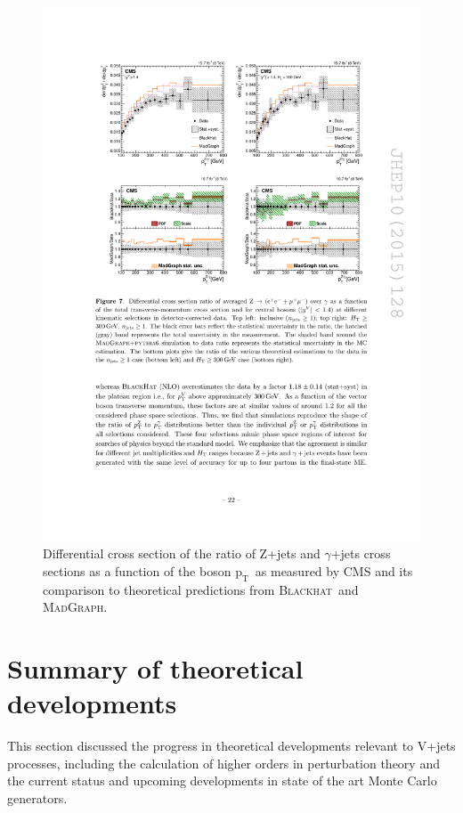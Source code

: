 \documentclass[a4paper,11pt,notoc]{article}
\newcommand{\pt}{\ensuremath{\mathrm{p_T}}}
\newcommand{\BLACKHAT}{\textsc{Blackhat}}
\newcommand{\MADGRAPH}{\textsc{MadGraph}}
\begin{document}
\begin{figure}[t!]
\centering
\includegraphics[width=0.9\columnwidth]{ZgammaratioCMS.pdf} 
\caption{Differential cross section of the ratio of Z+jets and $\gamma$+jets cross sections as a function of the boson \pt\ as measured by CMS and its comparison to theoretical predictions from \BLACKHAT\ and \MADGRAPH.}
\label{fig:ptNNLO}
\end{figure}   


\section{Summary of theoretical developments}
This section discussed the progress in theoretical developments relevant to V+jets processes, including the calculation of higher orders in perturbation theory and the current status and upcoming developments in state of the art Monte Carlo generators. 
\end{document}
